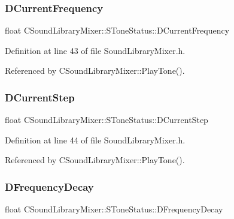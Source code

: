 \subsubsection{\texorpdfstring{D\+Current\+Frequency}{DCurrentFrequency}}
{\footnotesize\ttfamily float C\+Sound\+Library\+Mixer\+::\+S\+Tone\+Status\+::\+D\+Current\+Frequency}



Definition at line 43 of file Sound\+Library\+Mixer.\+h.



Referenced by C\+Sound\+Library\+Mixer\+::\+Play\+Tone().

\hypertarget{structCSoundLibraryMixer_1_1SToneStatus_a4ad3b9cbb161945d34d2aa6f2bcf7ef4}{}\label{structCSoundLibraryMixer_1_1SToneStatus_a4ad3b9cbb161945d34d2aa6f2bcf7ef4} 
\subsubsection{\texorpdfstring{D\+Current\+Step}{DCurrentStep}}
{\footnotesize\ttfamily float C\+Sound\+Library\+Mixer\+::\+S\+Tone\+Status\+::\+D\+Current\+Step}



Definition at line 44 of file Sound\+Library\+Mixer.\+h.



Referenced by C\+Sound\+Library\+Mixer\+::\+Play\+Tone().

\hypertarget{structCSoundLibraryMixer_1_1SToneStatus_af7965b72940ecf75158c86bd08743223}{}\label{structCSoundLibraryMixer_1_1SToneStatus_af7965b72940ecf75158c86bd08743223} 
\subsubsection{\texorpdfstring{D\+Frequency\+Decay}{DFrequencyDecay}}
{\footnotesize\ttfamily float C\+Sound\+Library\+Mixer\+::\+S\+Tone\+Status\+::\+D\+Frequency\+Decay}



